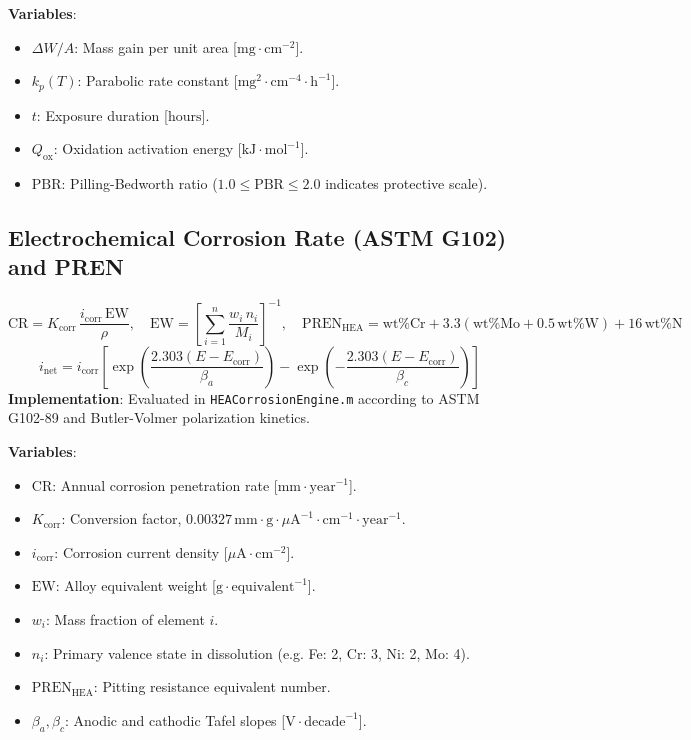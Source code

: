 \documentclass[11pt,a4paper]{article}
\begin{document}
\noindent\textbf{Variables}:
\begin{itemize}
  \item $\Delta W / A$: Mass gain per unit area [$\text{mg}\cdot\text{cm}^{-2}$].
  \item $k_p(T)$: Parabolic rate constant [$\text{mg}^2\cdot\text{cm}^{-4}\cdot\text{h}^{-1}$].
  \item $t$: Exposure duration [$\text{hours}$].
  \item $Q_{\text{ox}}$: Oxidation activation energy [$\text{kJ}\cdot\text{mol}^{-1}$].
  \item $\text{PBR}$: Pilling-Bedworth ratio ($1.0 \le \text{PBR} \le 2.0$ indicates protective scale).
\end{itemize}

\subsection{Electrochemical Corrosion Rate (ASTM G102) and PREN}
\begin{equation}
\text{CR} = K_{\text{corr}} \, \frac{i_{\text{corr}} \, \text{EW}}{\rho}, \quad \text{EW} = \left[ \sum_{i=1}^n \frac{w_i \, n_i}{M_i} \right]^{-1}, \quad \text{PREN}_{\text{HEA}} = \text{wt}\%\text{Cr} + 3.3 (\text{wt}\%\text{Mo} + 0.5\,\text{wt}\%\text{W}) + 16\,\text{wt}\%\text{N}
\end{equation}
\begin{equation}
i_{\text{net}} = i_{\text{corr}} \left[ \exp\left(\frac{2.303(E - E_{\text{corr}})}{\beta_a}\right) - \exp\left(-\frac{2.303(E - E_{\text{corr}})}{\beta_c}\right) \right]
\end{equation}
\textbf{Implementation}: Evaluated in \texttt{HEACorrosionEngine.m} according to ASTM G102-89 and Butler-Volmer polarization kinetics.

\noindent\textbf{Variables}:
\begin{itemize}
  \item $\text{CR}$: Annual corrosion penetration rate [$\text{mm}\cdot\text{year}^{-1}$].
  \item $K_{\text{corr}}$: Conversion factor, $0.00327 \, \text{mm}\cdot\text{g}\cdot\mu\text{A}^{-1}\cdot\text{cm}^{-1}\cdot\text{year}^{-1}$.
  \item $i_{\text{corr}}$: Corrosion current density [$\mu\text{A}\cdot\text{cm}^{-2}$].
  \item $\text{EW}$: Alloy equivalent weight [$\text{g}\cdot\text{equivalent}^{-1}$].
  \item $w_i$: Mass fraction of element $i$.
  \item $n_i$: Primary valence state in dissolution (e.g. Fe: 2, Cr: 3, Ni: 2, Mo: 4).
  \item $\text{PREN}_{\text{HEA}}$: Pitting resistance equivalent number.
  \item $\beta_a, \beta_c$: Anodic and cathodic Tafel slopes [$\text{V}\cdot\text{decade}^{-1}$].
\end{itemize}
\end{document}
